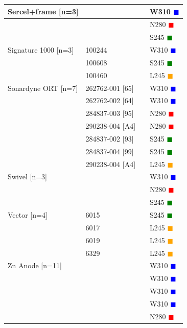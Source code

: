 \documentclass{article}
\begin{document}
\begin{tabularx}{\linewidth}{|X|l|l|X|}
Sercel+frame [n=3] &  &  & W310 \textcolor{blue}{$\blacksquare$} \\ \hline
 &  &  & N280 \textcolor{red}{$\blacksquare$} \\ \hline
 &  &  & S245 \textcolor{green}{$\blacksquare$} \\ \hline
Signature 1000 [n=3] & 100244 &  & W310 \textcolor{blue}{$\blacksquare$} \\ \hline
 & 100608 &  & S245 \textcolor{green}{$\blacksquare$} \\ \hline
 & 100460 &  & L245 \textcolor{orange}{$\blacksquare$} \\ \hline
Sonardyne ORT [n=7] & 262762-001 [65] &  & W310 \textcolor{blue}{$\blacksquare$} \\ \hline
 & 262762-002 [64] &  & W310 \textcolor{blue}{$\blacksquare$} \\ \hline
 & 284837-003 [95] &  & N280 \textcolor{red}{$\blacksquare$} \\ \hline
 & 290238-004 [A4] &  & N280 \textcolor{red}{$\blacksquare$} \\ \hline
 & 284837-002 [93] &  & S245 \textcolor{green}{$\blacksquare$} \\ \hline
 & 284837-004 [99] &  & S245 \textcolor{green}{$\blacksquare$} \\ \hline
 & 290238-004 [A4] &  & L245 \textcolor{orange}{$\blacksquare$} \\ \hline
Swivel [n=3] &  &  & W310 \textcolor{blue}{$\blacksquare$} \\ \hline
 &  &  & N280 \textcolor{red}{$\blacksquare$} \\ \hline
 &  &  & S245 \textcolor{green}{$\blacksquare$} \\ \hline
Vector [n=4] & 6015 &  & S245 \textcolor{green}{$\blacksquare$} \\ \hline
 & 6017 &  & L245 \textcolor{orange}{$\blacksquare$} \\ \hline
 & 6019 &  & L245 \textcolor{orange}{$\blacksquare$} \\ \hline
 & 6329 &  & L245 \textcolor{orange}{$\blacksquare$} \\ \hline
Zn Anode [n=11] &  &  & W310 \textcolor{blue}{$\blacksquare$} \\ \hline
 &  &  & W310 \textcolor{blue}{$\blacksquare$} \\ \hline
 &  &  & W310 \textcolor{blue}{$\blacksquare$} \\ \hline
 &  &  & W310 \textcolor{blue}{$\blacksquare$} \\ \hline
 &  &  & N280 \textcolor{red}{$\blacksquare$} \\ \hline

\end{tabularx}
\end{document}
